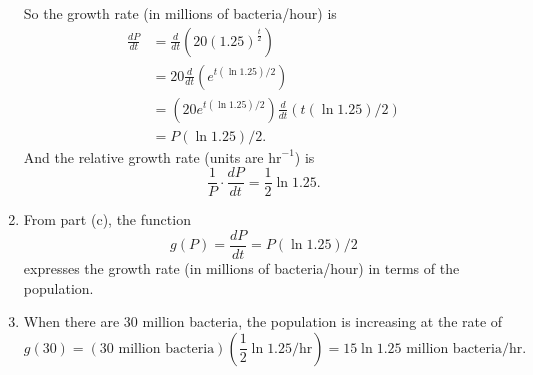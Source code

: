 \documentclass{ximera}
\begin{document}
\begin{question}
\begin{explanation}
\begin{enumerate}
So the growth rate (in millions of bacteria/hour) is 
\begin{align*}
  \frac{dP}{dt} &= \frac{d}{dt} \left(  20(1.25)^{\frac{t}{2}} \right) \\
                     &= 20 \frac{d}{dt}\left( e^{t (\ln 1.25)/2}\right) \\
                     &= \left( 20 e^{t (\ln 1.25)/2}\right) \frac{d}{dt} \left(  t (\ln 1.25)/2 \right) \\
                     &= P (\ln 1.25)/2 .
\end{align*}
And the relative growth rate (units are $\text{hr}^{-1}$) is
\[
  \frac{1}{P} \cdot   \frac{dP}{dt} = \frac{1}{2}\ln 1.25.
\]

\item From part (c), the function
\[
   g(P) = \frac{dP}{dt} = P (\ln 1.25)/2 
\]
expresses the growth rate (in millions of bacteria/hour) in terms of the population.

\item When there are 30 million bacteria, the population is increasing at the rate of 
\[
       g(30) = (30 \text{ million bacteria}) \left(\frac{1}{2}\ln 1.25 /\text{hr}\right) = 15 \ln 1.25 \text{ million bacteria/hr}.
\]
\end{enumerate}
\end{explanation}

\end{question}
\end{document}
